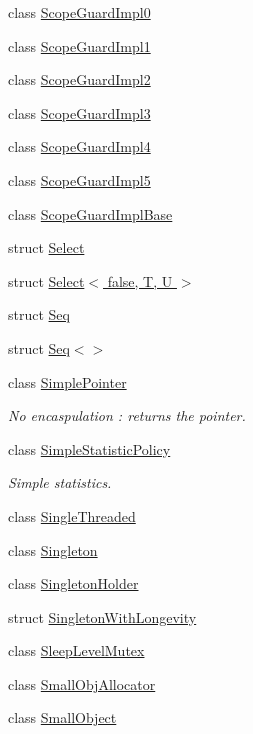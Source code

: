 \begin{DoxyCompactItemize}
class \hyperlink{classLoki_1_1ScopeGuardImpl0}{Scope\+Guard\+Impl0}
\item 
class \hyperlink{classLoki_1_1ScopeGuardImpl1}{Scope\+Guard\+Impl1}
\item 
class \hyperlink{classLoki_1_1ScopeGuardImpl2}{Scope\+Guard\+Impl2}
\item 
class \hyperlink{classLoki_1_1ScopeGuardImpl3}{Scope\+Guard\+Impl3}
\item 
class \hyperlink{classLoki_1_1ScopeGuardImpl4}{Scope\+Guard\+Impl4}
\item 
class \hyperlink{classLoki_1_1ScopeGuardImpl5}{Scope\+Guard\+Impl5}
\item 
class \hyperlink{classLoki_1_1ScopeGuardImplBase}{Scope\+Guard\+Impl\+Base}
\item 
struct \hyperlink{structLoki_1_1Select}{Select}
\item 
struct \hyperlink{structLoki_1_1Select_3_01false_00_01T_00_01U_01_4}{Select$<$ false, T, U $>$}
\item 
struct \hyperlink{structLoki_1_1Seq}{Seq}
\item 
struct \hyperlink{structLoki_1_1Seq_3_4}{Seq$<$$>$}
\item 
class \hyperlink{classLoki_1_1SimplePointer}{Simple\+Pointer}
\begin{DoxyCompactList}\small\item\em No encaspulation \+: returns the pointer. \end{DoxyCompactList}\item 
class \hyperlink{classLoki_1_1SimpleStatisticPolicy}{Simple\+Statistic\+Policy}
\begin{DoxyCompactList}\small\item\em Simple statistics. \end{DoxyCompactList}\item 
class \hyperlink{classLoki_1_1SingleThreaded}{Single\+Threaded}
\item 
class \hyperlink{classLoki_1_1Singleton}{Singleton}
\item 
class \hyperlink{classLoki_1_1SingletonHolder}{Singleton\+Holder}
\item 
struct \hyperlink{classLoki_1_1SingletonWithLongevity}{Singleton\+With\+Longevity}
\item 
class \hyperlink{classLoki_1_1SleepLevelMutex}{Sleep\+Level\+Mutex}
\item 
class \hyperlink{classLoki_1_1SmallObjAllocator}{Small\+Obj\+Allocator}
\item 
class \hyperlink{classLoki_1_1SmallObject}{Small\+Object}

\end{DoxyCompactItemize}
